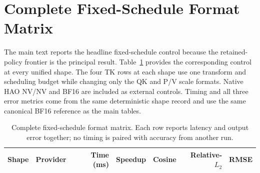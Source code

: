 \section{Complete Fixed-Schedule Format Matrix}
\label{app:format-matrix}

The main text reports the headline fixed-schedule control because the
retained-policy frontier is the principal result. Table~\ref{tab:all-formats}
provides the corresponding control at every unified shape. The four TK rows
at each shape use one transform and scheduling budget while changing only the
QK and P/V scale formats. Native HAO NV/NV and BF16 are included as external
controls. Timing and all three error metrics come from the same deterministic
shape record and use the same canonical BF16 reference as the main tables.

\begin{table}[htbp]
\centering
\caption{Complete fixed-schedule format matrix. Each row reports latency and output
error together; no timing is paired with accuracy from another run.}
\label{tab:all-formats}
\scriptsize
\begin{tabular}{llrrrrr}
\toprule
Shape & Provider & Time (ms) & Speedup & Cosine & Relative-$L_2$ & RMSE \\
\midrule
%
\end{tabular}
\end{table}
\FloatBarrier

